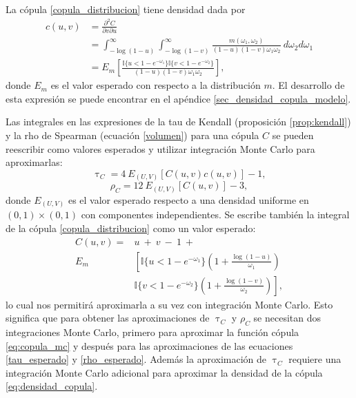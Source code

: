 \documentclass[11pt,a4paper]{article}
\begin{document}
La cópula \eqref{copula_distribucion} tiene densidad dada por
\begin{align}
c(u, v) &= \frac{\partial^2C}{\partial v \partial u}\nonumber\\
&= \int_{-\log (1-u)}^\infty \int_{-\log (1-v)}^\infty \frac{m(\omega_1, \omega_2)}{(1-u)(1-v)\omega_1\omega_2} \ d\omega_2 d\omega_1 \nonumber\\
&= E_{m} \left[\frac{\mathbb{I}\lbrace u < 1-e^{-\omega_1}\rbrace \mathbb{I}\lbrace v < 1-e^{-\omega_2} \rbrace}{(1-u)(1-v)\omega_1\omega_2}\right],
\label{eq:densidad_copula}
\end{align}
donde $E_m$ es el valor esperado con respecto a la distribución $m$. El desarrollo de esta expresión se puede encontrar en el apéndice \ref{sec_densidad_copula_modelo}.

Las integrales en las expresiones de la tau de Kendall (proposición \ref{prop:kendall}) y la rho de Spearman (ecuación \eqref{volumen})  para una cópula $C$ se pueden reescribir como valores esperados y utilizar integración Monte Carlo para aproximarlas:
\begin{equation} \label{tau_esperado}
\uptau_{C} = 4 \ E_{(U, V)}\left[C(u, v) c(u, v)\right] -1,
\end{equation}
\begin{equation} \label{rho_esperado}
\rho_{C} = 12 \ E_{(U, V)}\left[C(u, v)\right] -3,
\end{equation}
donde $E_{(U, V)}$ es el valor esperado respecto a una densidad uniforme en \newline $(0, 1)\times (0, 1)$ con componentes independientes. Se escribe también la integral de la cópula \eqref{copula_distribucion} como un valor esperado:
\begin{align}
C(u, v) = &u \ + \ v \ - \ 1 \ +\nonumber\\
E_{m} & \left[\mathbb{I}\lbrace u < 1-e^{-\omega_1}\rbrace\left(1 + \frac{\log (1-u)}{\omega_1}\right) \right.\nonumber\\
& \left. \mathbb{I}\lbrace v < 1-e^{-\omega_2}\rbrace\left(1 + \frac{\log (1-v)}{\omega_2}\right)\right], \label{eq:copula_mc}
\end{align}
lo cual nos permitirá aproximarla a su vez con integración Monte Carlo. Esto significa que para obtener las aproximaciones de $\uptau_C$ y $\rho_C$ se necesitan dos integraciones Monte Carlo, primero para aproximar la función cópula \eqref{eq:copula_mc} y después para las aproximaciones de las ecuaciones \eqref{tau_esperado} y \eqref{rho_esperado}. Además la aproximación de $\uptau_C$ requiere una integración Monte Carlo adicional para aproximar la densidad de la cópula \eqref{eq:densidad_copula}.
\end{document}
